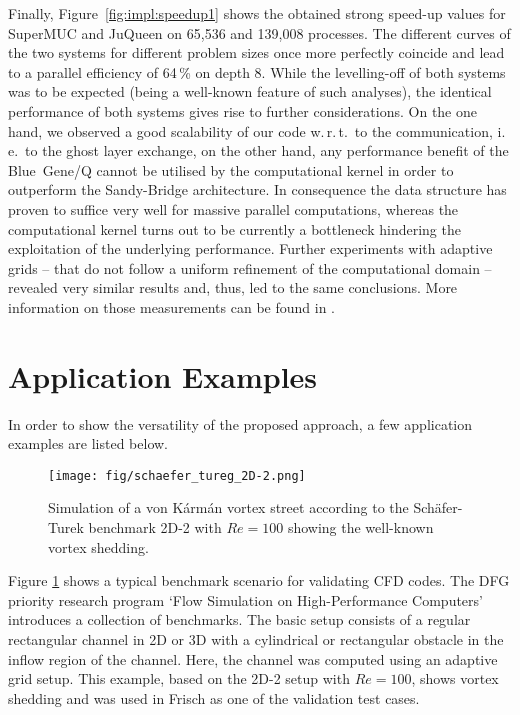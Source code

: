 \documentclass[10pt, conference, compsocconf]{IEEEtran}
\begin{document}
Finally, Figure~\ref{fig:impl:speedup1} shows the obtained strong speed-up values for SuperMUC and JuQueen on 65,536 and 139,008 processes. The different curves of the two systems for different problem sizes once more perfectly coincide and lead to a parallel efficiency of 64\,\% on depth 8. While the levelling-off of both systems was to be expected (being a well-known feature of such analyses), the identical performance of both systems gives rise to further considerations. On the one hand, we observed a good scalability of our code w.\,r.\,t.\ to the communication, i.\,e.\ to the ghost layer exchange, on the other hand, any performance benefit of the Blue~Gene/Q cannot be utilised by the computational kernel in order to outperform the Sandy-Bridge architecture. In consequence the data structure has proven to suffice very well for massive parallel computations, whereas the computational kernel turns out to be currently a bottleneck hindering the exploitation of the underlying performance. Further experiments with adaptive grids -- that do not follow a uniform refinement of the computational domain -- revealed very similar results and, thus, led to the same conclusions. More information on those measurements can be found in \cite{Frisch2014Diss}.

\section{Application Examples}

In order to show the versatility of the proposed approach, a few application examples are listed below.

\begin{figure}[ht]
	\centering
		\texttt{[image: fig/schaefer\_tureg\_2D-2.png]}
	\caption{Simulation of a von K\'arm\'an vortex street according to the Sch\"afer-Turek \cite{SchaeferTurek1996} benchmark 2D-2 with $Re=100$ showing the well-known vortex shedding.}
	\label{fig:schaefer_tureg_2D-2}
\end{figure}

Figure \ref{fig:schaefer_tureg_2D-2} shows a typical benchmark scenario for validating CFD codes. The DFG priority research program `Flow Simulation on High-Performance Computers' \cite{SchaeferTurek1996} introduces a collection of benchmarks. The basic setup consists of a regular rectangular channel in 2D or 3D with a cylindrical or rectangular obstacle in the inflow region of the channel. Here, the channel was computed using an adaptive grid setup. This example, based on the 2D-2 setup with $Re=100$, shows vortex shedding and was used in Frisch \cite{Frisch2014Diss} as one of the validation test cases.
\end{document}
